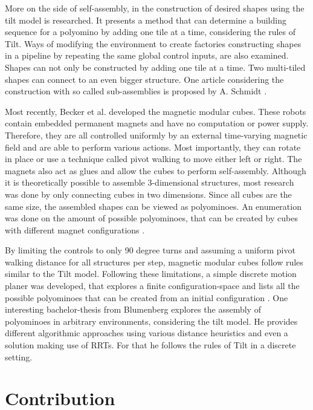 More on the side of self-assembly, in \cite{Fekete2020} the construction of desired shapes using the tilt model is researched.
It presents a method that can determine a building sequence for a polyomino by adding one tile at a time, considering the rules of Tilt.
Ways of modifying the environment to create factories constructing shapes in a pipeline by repeating the same global control inputs, are also examined.
Shapes can not only be constructed by adding one tile at a time.
Two multi-tiled shapes can connect to an even bigger structure.
One article considering the construction with so called sub-assemblies is proposed by A. Schmidt \cite{Schmidt2018}.

Most recently, Becker et al. \cite{Becker2022} developed the magnetic modular cubes.
These robots contain embedded permanent magnets and have no computation or power supply.
Therefore, they are all controlled uniformly by an external time-varying magnetic field and are able to perform various actions.
Most importantly, they can rotate in place or use a technique called pivot walking to move either left or right.
The magnets also act as glues and allow the cubes to perform self-assembly.
Although it is theoretically possible to assemble 3-dimensional structures, most research was done by only connecting cubes in two dimensions.
Since all cubes are the same size, the assembled shapes can be viewed as polyominoes.
An enumeration was done on the amount of possible polyominoes, that can be created by cubes with different magnet configurations \cite{Becker2021}.

By limiting the controls to only 90 degree turns and assuming a uniform pivot walking distance for all structures per step, magnetic modular cubes follow rules similar to the Tilt model.
Following these limitations, a simple discrete motion planer was developed, that explores a finite configuration-space and lists all the possible polyominoes that can be created from an initial configuration \cite{Becker2022}.
One interesting bachelor-thesis from Blumenberg \cite{Blumenberg2022} explores the assembly of polyominoes in arbitrary environments, considering the tilt model.
He provides different algorithmic approaches using various distance heuristics and even a solution making use of RRTs.
For that he follows the rules of Tilt in a discrete setting.


\section{Contribution}
